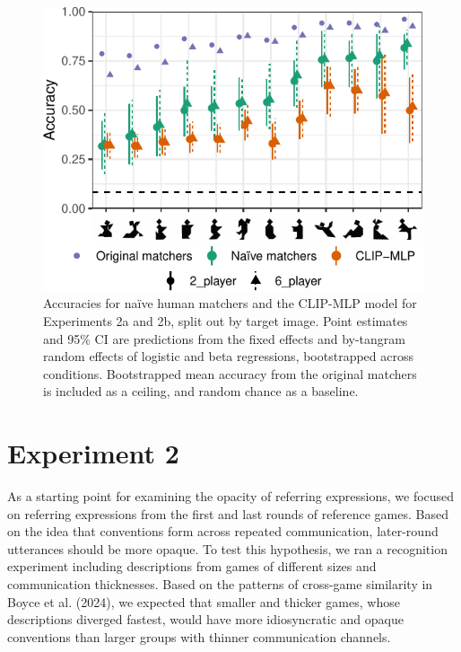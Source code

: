 \documentclass[10pt, letterpaper]{article}
\begin{document}
\begin{CodeChunk}
\begin{figure}[t]

{\centering \includegraphics[width=0.9\linewidth]{figs/fig-2-1} 

}

\caption[Accuracies for naïve human matchers and the CLIP-MLP model for Experiments 2a and 2b, split out by target image]{Accuracies for naïve human matchers and the CLIP-MLP model for Experiments 2a and 2b, split out by target image. Point estimates and 95\% CI are predictions from the fixed effects and by-tangram random effects of logistic and beta regressions, bootstrapped across conditions. Bootstrapped mean accuracy from the original matchers is included as a ceiling, and random chance as a baseline. \label{expt2-tangram}}\label{fig:fig-2}
\end{figure}
\end{CodeChunk}

\section{Experiment 2}\label{experiment-2}

As a starting point for examining the opacity of referring expressions,
we focused on referring expressions from the first and last rounds of
reference games. Based on the idea that conventions form across repeated
communication, later-round utterances should be more opaque. To test
this hypothesis, we ran a recognition experiment including descriptions
from games of different sizes and communication thicknesses. Based on
the patterns of cross-game similarity in Boyce et al. (2024), we
expected that smaller and thicker games, whose descriptions diverged
fastest, would have more idiosyncratic and opaque conventions than
larger groups with thinner communication channels.
\end{document}
